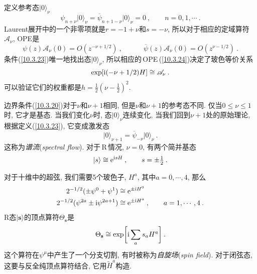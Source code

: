 定义参考态$ \lvert 0\rangle_{\nu} $
\begin{equation}
    \psi_{n+\nu}\lvert 0\rangle_{\nu} = \overline{\psi}_{n+1-\nu}\lvert 0\rangle_{\nu}=0\:,\qquad
    n=0,1,\cdots\:. \label{10.3.23}
\end{equation}
Laurent展开中的一个非零项就是$ r=-1+\nu $和$ s=-\nu$, 所以对于相应的定域算符$ \mathscr{A}_{\nu}$, OPE是
\begin{equation}
    \psi(z)\mathscr{A}_{\nu}(0)=O(z^{-\nu+1/2})\:, \qquad  \quad
    \overline{\psi}(z)\mathscr{A}_{\nu}(0) = O(z^{\nu-1/2})\:. \label{10.3.24}
\end{equation}
条件(\ref{10.3.23})唯一地找出态$ \lvert 0\rangle_{\nu}$, 所以相应的\,OPE\,(\ref{10.3.24})决定了玻色等价关系
\begin{equation}
    \exp[\mathrm{i}(-\nu+1/2)H]\cong \mathscr{A}_{\nu} \:. \label{10.3.25}
\end{equation}
可以验证它们的权重都是$ h=\tfrac{1}{2}(\nu-\tfrac{1}{2})^{2}$.

边界条件(\ref{10.3.20})对于$ \nu $和$ \nu+1 $相同, 但是$ \nu $和$ \nu+1 $的参考态不同. 仅当$ 0\leq\nu\leq1 $时, 它才是基态. 当我们变化$ \nu $时, 态$ \lvert 0\rangle_{\nu} $连续变化, 当我们回到$ \nu+1 $处的原始理论, 根据定义(\ref{10.3.23}), 它变成激发态
\begin{equation}
    \lvert 0\rangle_{\nu+1} =\overline{\psi}_{-\nu}\lvert 0\rangle_{\nu} \:. \label{10.3.26}
\end{equation}
这称为{\emph{谱流}}(\emph{spectral flow}). 对于\,R\,情况, $\nu=0$, 有两个简并基态
\begin{equation}
    \lvert s\rangle \cong \mathrm{e}^{\mathrm{i} s H} \:, \qquad s=\pm\tfrac{1}{2} \:. \label{10.3.27}
\end{equation}

对于十维中的超弦, 我们需要5个玻色子, $H^{a}$, 其中$ a=0,\cdots,4$, 那么
\begin{subequations}
\begin{align}
    2^{-1/2}(\pm\psi^{0}+\psi^{1}) &\cong \mathrm{e}^{\pm\mathrm{i} H^{0}} \label{10.3.28a}\\
    2^{-1/2}(\psi^{2a}\pm \mathrm{i}\psi^{2a+1}) &\cong \mathrm{e}^{\pm\mathrm{i} H^{a}} \:, \qquad a=1,\cdots,4\:. \label{10.3.28b}
\end{align} \label{10.3.28}
\end{subequations}
R态$ \lvert \mathbf{s}\rangle$的顶点算符$ \Theta_{\mathbf{s}} $是
\begin{equation}
    \Theta_{\mathbf{s}}\cong \exp\biggl[\mathrm{i}\sum_{a}s_{a}H^{a}\biggr] \:. \label{10.3.29}
\end{equation}
这个算符在$ \psi^{\mu} $中产生了一个分支切割, 有时被称为{\emph{自旋场}}(\emph{spin field}). 对于闭弦态, 这要与反全纯顶点算符结合, 它用$ \tilde{H}^{a} $构造.

